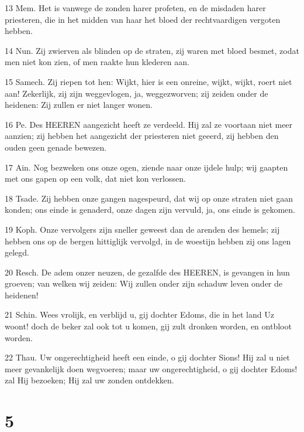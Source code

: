 \par 13 Mem. Het is vanwege de zonden harer profeten, en de misdaden harer priesteren, die in het midden van haar het bloed der rechtvaardigen vergoten hebben.
\par 14 Nun. Zij zwierven als blinden op de straten, zij waren met bloed besmet, zodat men niet kon zien, of men raakte hun klederen aan.
\par 15 Samech. Zij riepen tot hen: Wijkt, hier is een onreine, wijkt, wijkt, roert niet aan! Zekerlijk, zij zijn weggevlogen, ja, weggezworven; zij zeiden onder de heidenen: Zij zullen er niet langer wonen.
\par 16 Pe. Des HEEREN aangezicht heeft ze verdeeld. Hij zal ze voortaan niet meer aanzien; zij hebben het aangezicht der priesteren niet geeerd, zij hebben den ouden geen genade bewezen.
\par 17 Ain. Nog bezweken ons onze ogen, ziende naar onze ijdele hulp; wij gaapten met ons gapen op een volk, dat niet kon verlossen.
\par 18 Tsade. Zij hebben onze gangen nagespeurd, dat wij op onze straten niet gaan konden; ons einde is genaderd, onze dagen zijn vervuld, ja, ons einde is gekomen.
\par 19 Koph. Onze vervolgers zijn sneller geweest dan de arenden des hemels; zij hebben ons op de bergen hittiglijk vervolgd, in de woestijn hebben zij ons lagen gelegd.
\par 20 Resch. De adem onzer neuzen, de gezalfde des HEEREN, is gevangen in hun groeven; van welken wij zeiden: Wij zullen onder zijn schaduw leven onder de heidenen!
\par 21 Schin. Wees vrolijk, en verblijd u, gij dochter Edoms, die in het land Uz woont! doch de beker zal ook tot u komen, gij zult dronken worden, en ontbloot worden.
\par 22 Thau. Uw ongerechtigheid heeft een einde, o gij dochter Sions! Hij zal u niet meer gevankelijk doen wegvoeren; maar uw ongerechtigheid, o gij dochter Edoms! zal Hij bezoeken; Hij zal uw zonden ontdekken.

\chapter{5}

